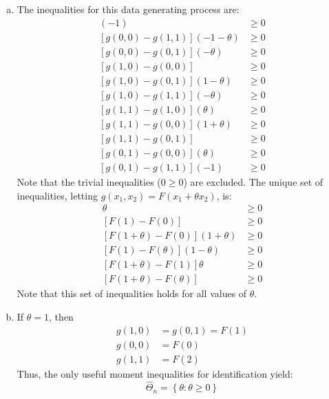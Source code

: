 \documentclass{article}
\begin{document}
\begin{enumerate}[(a)]
    \item The inequalities for this data generating process are:\begin{align*}
        [g(0, 0) - g(1, 0)](-1)         &\geq 0 \\
        [g(0, 0) - g(1, 1)](-1 -\theta) &\geq 0 \\
        [g(0, 0) - g(0, 1)](- \theta)   &\geq 0 \\
        [g(1, 0) - g(0, 0)]             &\geq 0 \\
        [g(1, 0) - g(0, 1)](1 - \theta) &\geq 0 \\
        [g(1, 0) - g(1, 1)](- \theta)   &\geq 0 \\
        [g(1, 1) - g(1, 0)](\theta)     &\geq 0 \\
        [g(1, 1) - g(0, 0)](1 + \theta) &\geq 0 \\
        [g(1, 1) - g(0, 1)]             &\geq 0 \\
        [g(0, 1) - g(0, 0)](\theta)     &\geq 0 \\
        [g(0, 1) - g(1, 1)](-1)         &\geq 0 
    \end{align*}
    Note that the trivial inequalities ($0\geq 0$) are excluded. The unique set of inequalities, letting $g(x_1, x_2) = F(x_1 + \theta x_2)$, is:\begin{align}
        [F(\theta) - F(0)]\theta            &\geq 0 \\
        [F(1) - F(0)]                       &\geq 0 \\
        [F(1+\theta) - F(0)](1 + \theta)    &\geq 0 \\
        [F(1) - F(\theta)](1 - \theta)      &\geq 0 \\
        [F(1+\theta) - F(1)]\theta          &\geq 0 \\
        [F(1+\theta) - F(\theta)]           &\geq 0 
    \end{align}
    Note that this set of inequalities holds for all values of $\theta$. 

    \item If $\theta=1$, then\begin{align*}
        g(1, 0) &= g(0, 1) = F(1)  \\
        g(0, 0) &= F(0)            \\
        g(1, 1) &= F(2)
    \end{align*}
    Thus, the only useful moment inequalities for identification yield:\[
        \hat{\Theta}_n = \left\{\theta: \theta\geq0\right\}
    \]


\end{enumerate}
\end{document}
